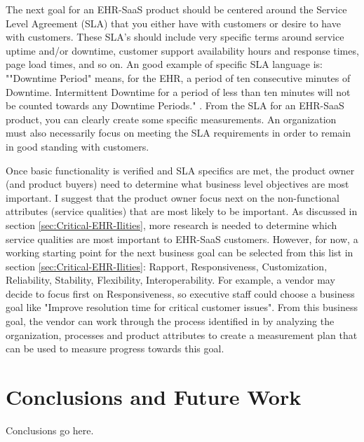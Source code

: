 \documentclass[10pt]{article}
\begin{document}
The next goal for an EHR-SaaS product should be centered around the Service Level Agreement (SLA) that you either have with customers or desire to have with customers.
These SLA's should include very specific terms around service uptime and/or downtime, customer support availability hours and response times, page load times, and so on.
An good example of specific SLA language is: ""Downtime Period" means, for the EHR, a period of ten consecutive minutes of Downtime. Intermittent Downtime for a period of less than ten minutes will not be counted towards any Downtime Periods." \cite{emr-sla-example}. 
From the SLA for an EHR-SaaS product, you can clearly create some specific measurements.
An organization must also necessarily focus on meeting the SLA requirements in order to remain in good standing with customers.

Once basic functionality is verified and SLA specifics are met, the product owner (and product buyers) need to determine what business level objectives are most important.
I suggest that the product owner focus next on the non-functional attributes (service qualities) that are most likely to be important.
As discussed in section \ref{sec:Critical-EHR-Ilities}, more research is needed to determine which service qualities are most important to EHR-SaaS customers.
However, for now, a working starting point for the next business goal can be selected from this list in section \ref{sec:Critical-EHR-Ilities}: Rapport, Responsiveness, Customization, Reliability, Stability, Flexibility, Interoperability.
For example, a vendor may decide to focus first on Responsiveness, so executive staff could choose a business goal like "Improve resolution time for critical customer issues".
From this business goal, the vendor can work through the process identified in \cite{sei-gqim} by analyzing the organization, processes and product attributes to create a measurement plan that can be used to measure progress towards this goal.



\section{Conclusions and Future Work}

Conclusions go here. 



\end{document}
